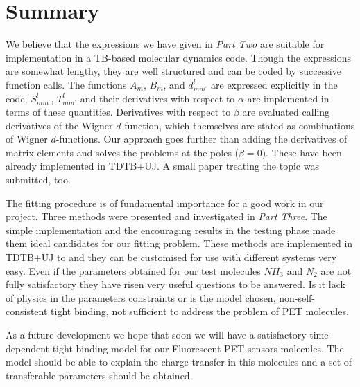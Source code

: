 \section{Summary}
\par{We believe that the expressions we have given in \emph{Part Two} are suitable for
implementation in a TB-based molecular dynamics code. Though the expressions
are somewhat lengthy, they are well structured and can be coded by successive
function calls. The functions $A_{m}$, $B_{m}$, and $d^{l}_{mm^{\prime}}$ are expressed explicitly in the code, $S^{l}_{mm^{\prime}}$,
$T^{l}_{mm^{\prime}}$ and their derivatives with respect to $\alpha$ are implemented in terms of
these quantities. Derivatives with respect to $\beta$ are evaluated calling derivatives of the
Wigner $d$-function, which themselves are stated as combinations of Wigner
$d$-functions. Our approach goes further than \citep{Podolskiy04} adding the derivatives
of matrix elements and solves the problems at the poles ($\beta=0$). These have been already implemented in TDTB+UJ. A small paper
treating the topic was submitted, too.}
\par{The fitting procedure is of fundamental importance for a good work in our
project. Three methods were presented and investigated in \emph{Part Three}. The
simple implementation and the encouraging results in the testing phase made
them ideal candidates for our fitting problem. These methods are implemented
in TDTB+UJ to and they can be customised for use with different systems very
easy. Even if the parameters obtained for our test molecules $NH_3$ and $N_2$
are not fully satisfactory they have risen very useful questions to be
answered. Is it lack of physics in the parameters constraints or is the  model
chosen, non-self-consistent tight binding, not sufficient to address the
problem of PET molecules.}
\par{As a future development we hope that soon we will have a satisfactory time
dependent tight binding model for our Fluorescent PET sensors molecules. The
model should be able to explain the charge transfer in this molecules and a
set of transferable parameters should be obtained. }